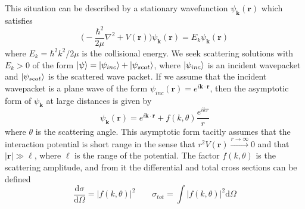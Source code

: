 \documentclass[prl,onecolumn,amsmath,amssymb,titlepage,nofootinbib,preprint]{revtex4-1}
\begin{document}
	This situation can be described by a stationary wavefunction $\psi_{\mathbf{k}}(\mathbf{r})$ which satisfies 
	\begin{equation}\label{eq:schroed}
		\bigg(-\frac{\hbar^{2}}{2\mu}\nabla^{2}+V(\mathbf{r})\bigg)\psi_{\mathbf{k}}(\mathbf{r})=E_{k}\psi_{\mathbf{k}}(\mathbf{r})
	\end{equation}
	where $E_{k}=\hbar^{2}k^{2}/2\mu$ is the collisional energy.  We seek scattering solutions with $E_{k}>0$ of the form $\ket{\psi}=\ket{\psi_{inc}}+\ket{\psi_{scat}}$, where $\ket{\psi_{inc}}$ is an incident wavepacket and $\ket{\psi_{scat}}$ is the scattered wave packet.  If we assume that the incident wavepacket is a plane wave of the form $\psi_{inc}(\mathbf{r})=e^{i\mathbf{k}\cdot\mathbf{r}}$, then the asymptotic form of $\psi_{\mathbf{k}}$ at large distances is given by 
	\begin{equation}\label{eq:scattering_wavefnc}
		\psi_{\mathbf{k}}(\mathbf{r})=e^{i\mathbf{k}\cdot\mathbf{r}}+f(k,\theta)\frac{e^{ikr}}{r}
	\end{equation}
	where $\theta$ is the scattering angle.  This asymptotic form tacitly assumes that the interaction potential is short range in the sense that $r^{2}V(\mathbf{r})\xrightarrow{r\rightarrow\infty}0$ and that $|\mathbf{r}|\gg\ell$, where $\ell$ is the range of the potential.  The factor $f(k,\theta)$ is the scattering amplitude, and from it the differential and total cross sections can be defined
	\begin{equation}\label{eq:cross_sections}
		\frac{\mathrm{d}\sigma}{\mathrm{d}\Omega}=|f(k,\theta)|^{2} \qquad \sigma_{tot}=\int|f(k,\theta)|^{2}\mathrm{d}\Omega
	\end{equation}
	
\end{document}
